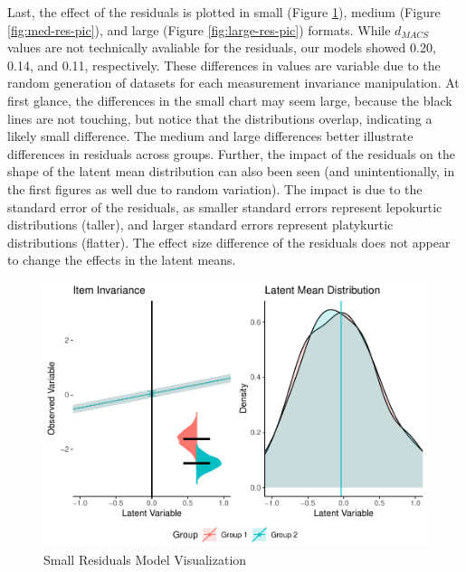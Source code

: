 \documentclass[
  man]{apa6}
\begin{document}
Last, the effect of the residuals is plotted in small (Figure \ref{fig:small-res-pic}), medium (Figure \ref{fig:med-res-pic}), and large (Figure \ref{fig:large-res-pic}) formats. While \(d_{MACS}\) values are not technically avaliable for the residuals, our models showed 0.20, 0.14, and 0.11, respectively. These differences in values are variable due to the random generation of datasets for each measurement invariance manipulation. At first glance, the differences in the small chart may seem large, because the black lines are not touching, but notice that the distributions overlap, indicating a likely small difference. The medium and large differences better illustrate differences in residuals across groups. Further, the impact of the residuals on the shape of the latent mean distribution can also been seen (and unintentionally, in the first figures as well due to random variation). The impact is due to the standard error of the residuals, as smaller standard errors represent lepokurtic distributions (taller), and larger standard errors represent platykurtic distributions (flatter). The effect size difference of the residuals does not appear to change the effects in the latent means.

\begin{figure}
\centering
\includegraphics{manuscript_files/figure-latex/small-res-pic-1.pdf}
\caption{\label{fig:small-res-pic}Small Residuals Model Visualization}
\end{figure}
\end{document}
